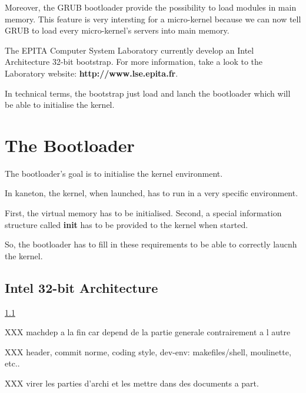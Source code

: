 Moreover, the GRUB bootloader provide the possibility to load
modules in main memory. This feature is very intersting for a micro-kernel
because we can now tell GRUB to load every micro-kernel's servers into
main memory.

The EPITA Computer System Laboratory currently develop an Intel Architecture
32-bit bootstrap. For more information, take a look to the Laboratory
website: \textbf{http://www.lse.epita.fr}.

In technical terms, the bootstrap just load and lanch the bootloader
which will be able to initialise the kernel.



\section{The Bootloader}

The bootloader's goal is to initialise the kernel environment.

In kaneton, the kernel, when launched, has to run in a very specific
environment.

First, the virtual memory has to be initialised. Second, a special
information structure called \textbf{init} has to be provided to
the kernel when started.

So, the bootloader has to fill in these requirements to be able
to correctly laucnh the kernel.

\subsection{Intel 32-bit Architecture}


\label{}
\ref{}
\pageref{}

XXX machdep a la fin car depend de la partie generale contrairement a l autre

XXX header, commit norme, coding style, dev-env: makefiles/shell, moulinette,
    etc..

XXX virer les parties d'archi et les mettre dans des documents a part.
